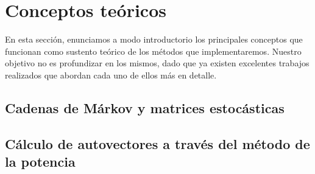 \section{Conceptos teóricos}

    En esta sección, enunciamos a modo introductorio los principales conceptos que funcionan como sustento teórico de los métodos que implementaremos. Nuestro objetivo no es profundizar en los mismos, dado que ya existen excelentes trabajos realizados que abordan cada uno de ellos más en detalle.

    \subsection{Cadenas de Márkov y matrices estocásticas}


    \subsection{Cálculo de autovectores a través del método de la potencia}


